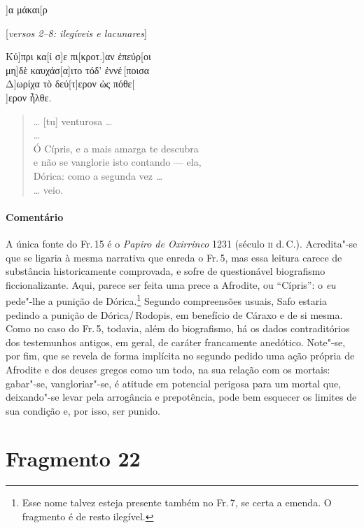 \begin{gkverse}
]α μάκαι[ρ

\textnormal{[\emph{versos 2--8: ilegíveis e lacunares}]}

Κύ]πρι κα[ί σ]ε πι[κροτ.]αν ἐπεύρ[οι\\
μη]δὲ καυχάσ[α]ιτο τόδ’ ἐννέ\,[ποισα\\
Δ]ωρίχα τὸ δεύ[τ]ερον ὠς πόθε[\\
]ερον ἦλθε.

\end{gkverse}

\begin{verse}
\ldots{} [tu] venturosa \ldots{}\\ 
\ldots{}\\
Ó Cípris, e a mais amarga te descubra\\
e não se vanglorie isto contando --- ela,\\
Dórica: como a segunda vez \ldots{}\\
\ldots{} veio.
\end{verse}


\paragraph{Comentário} A única fonte do Fr.\,15 é o \emph{Papiro de Oxirrinco} 1231 (século \textsc{ii} d.\,C.). 
Acredita"-se que se ligaria à mesma narrativa que enreda o Fr.\,5, mas essa
leitura carece de substância historicamente comprovada, e sofre de
questionável biografismo ficcionalizante. Aqui,
parece ser feita uma prece a Afrodite, ou ``Cípris'': o \emph{eu} pede"-lhe a
punição de Dórica.\footnote{Esse nome talvez esteja presente também no Fr.\,7, se certa a emenda. O fragmento é de resto ilegível.} Segundo compreensões usuais, Safo estaria pedindo a punição
de Dórica/\,Rodopis, em benefício de Cáraxo e de si mesma. Como no caso do Fr.\,5,
todavia, além do biografismo, há os dados contraditórios dos testemunhos
antigos, em geral, de caráter francamente anedótico. Note"-se, por fim, que se
revela de forma implícita no segundo pedido uma ação própria de Afrodite e dos
deuses gregos como um todo, na sua relação com os mortais: gabar"-se,
vangloriar"-se, é atitude em potencial perigosa para um mortal que,
deixando"-se levar pela arrogância e prepotência, pode bem esquecer
os limites de sua condição e, por isso, ser punido.




\section{Fragmento 22}

